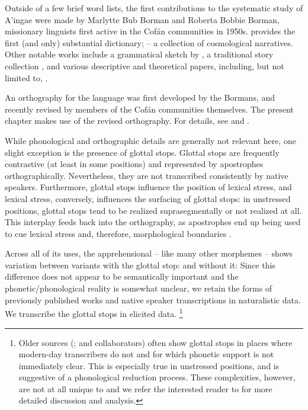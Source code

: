\documentclass[output=paper,colorlinks,citecolor=brown]{langscibook}
\begin{document}
Outside of a few brief word lists, the first contributions to the systematic study of A'ingae were made by Marlytte Bub Borman and Roberta Bobbie Borman, missionary linguists first active in the Cofán communities in 1950s. \citet{dictionary} provides the first (and only) substantial dictionary; \citet{borman1990cosmologia} -- a collection of cosmological narratives. Other notable works include a grammatical sketch by \citet{fischerhengeveld}, a traditional story collection \citep{Mitos}, and
various descriptive and theoretical papers, including, but not limited to, \citet{anderboissilva2018collection, repetti-ludlow2019aingae, pridetomlinlingview, dabkowski2019morphophonology, dabkowski2021ldd, dabkowski2021phonology, dabkowski2023nllt, dabkowski2024llc, sanker-reconstruction,  anderbois2023forms, dabkowski2024jos, anderbois2020salt, anderbois-llc, zheng2023definiteness, morvillo2021inner}.

An orthography for the language was first developed by the Bormans, and recently revised by members of the Cofán communities themselves. The present chapter makes use of the revised orthography. For details, see \citet{fischerhengeveld} and \citet{repetti-ludlow2019aingae}.

While phonological and orthographic details are generally not relevant here, one slight exception is the presence of glottal stops. Glottal stops are frequently contrastive (at least in some positions) and represented by apostrophes orthographically. Nevertheless, they are not transcribed consistently by native speakers. Furthermore, glottal stops influence the position of lexical stress, and lexical stress, conversely, influences the surfacing of glottal stops: in unstressed positions, glottal stops tend to be realized suprasegmentally or not realized at all. This interplay feeds back into the orthography, as apostrophes end up being used to cue lexical stress and, therefore, morphological boundaries \citep{dabkowski2023nllt}. 

Across all of its uses, the apprehensional  -- like many other mor\-phemes -- shows variation between variants with the glottal stop:  and without it:  Since this difference does not appear to be semantically important and the phonetic/phonological reality is somewhat unclear, we retain the forms of previously published works and native speaker transcriptions in naturalistic data. {We transcribe the glottal stops in elicited data.}%
\footnote{{Older sources (\citealt{borman1990cosmologia, borman1990lessons, dictionary}; and collaborators) often show glottal stops in places where modern-day transcribers do not and for which phonetic support is not immediately clear. This is especially true in unstressed positions, and is suggestive of a phonological reduction process. These complexities, however, are not at all unique to  and we refer the interested reader to \citet{dabkowski2023nllt} for more detailed discussion and analysis.}}
\end{document}
